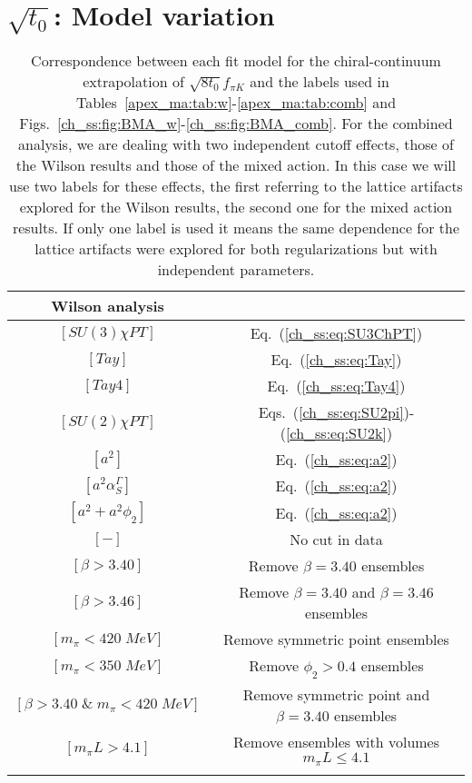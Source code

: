 
\chapter{$\sqrt{t_0}$: Model variation}
\label{apex_model_av_t0}


\begin{longtable}{c | c}
\label{apex_ma:tab:labels}
Wilson analysis \\
\toprule
$[SU(3)\chi PT]$ & Eq.~(\ref{ch_ss:eq:SU3ChPT}) \\
$[Tay]$ & Eq.~(\ref{ch_ss:eq:Tay}) \\
$[Tay4]$ & Eq.~(\ref{ch_ss:eq:Tay4}) \\
$[SU(2)\chi PT]$ & Eqs.~(\ref{ch_ss:eq:SU2pi})-(\ref{ch_ss:eq:SU2k}) \\
\midrule
$[a^2]$ & Eq.~(\ref{ch_ss:eq:a2}) \\
$[a^2\alpha_S^{\Gamma}]$ & Eq.~(\ref{ch_ss:eq:a2}) \\
$[a^2+a^2\phi_2]$ & Eq.~(\ref{ch_ss:eq:a2}) \\
\midrule
$[-]$ & No cut in data \\
$[\beta>3.40]$ & Remove $\beta=3.40$ ensembles \\
$[\beta>3.46]$ & Remove $\beta=3.40$ and $\beta=3.46$ ensembles \\
$[m_{\pi}<420\;MeV]$ & Remove symmetric point ensembles \\
$[m_{\pi}<350\;MeV]$ & Remove $\phi_2>0.4$ ensembles \\
$[\beta>3.40\;\&\;m_{\pi}<420\;MeV]$ & Remove symmetric point and $\beta=3.40$ ensembles \\
$[m_{\pi}L>4.1]$ & Remove ensembles with volumes $m_{\pi}L\leq4.1$ \\
\bottomrule
\caption{Correspondence between each fit model for the chiral-continuum extrapolation of $\sqrt{8t_0}f_{\pi K}$ and the labels used in Tables~\ref{apex_ma:tab:w}-\ref{apex_ma:tab:comb} and Figs.~\ref{ch_ss:fig:BMA_w}-\ref{ch_ss:fig:BMA_comb}. For the combined analysis, we are dealing with two independent cutoff effects, those of the Wilson results and those of the mixed action. In this case we will use two labels for these effects, the first referring to the lattice artifacts explored for the Wilson results, the second one for the mixed action results. If only one label is used it means the same dependence for the lattice artifacts were explored for both regularizations but with independent parameters.}
\end{longtable}


